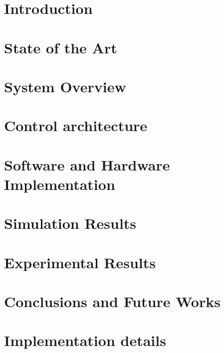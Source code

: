 \documentclass[12pt, twoside]{report}
\begin{document}
    
    \nocite{*}
    \pagestyle{empty}
    \tableofcontents
    
    \chapter{Introduction}
    
    \chapter{State of the Art}
    
    \chapter{System Overview}
    
    \chapter{Control architecture}
    
    \chapter{Software and Hardware Implementation}
    
    \chapter{Simulation Results}
    
    \chapter{Experimental Results}
    
    \chapter{Conclusions and Future Works}
    
    \appendix 
    \chapter{Implementation details}
    
    \printbibliography
\end{document}
